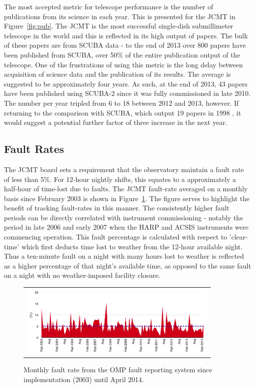 \documentclass[]{spie}  %
\begin{document}
The most accepted metric for telescope performance is the number of
publications from its science in each year. This is presented for the
JCMT in Figure~\ref{fig:pub}. The JCMT is the most successful
single-dish submillimeter telescope in the world and this is reflected
in its high output of papers. The bulk of these papers are from SCUBA
data - to the end of 2013 over 800 papers have been published from
SCUBA, over 50$\%$ of the entire publication output of the
telescope. One of the frustrations of using this metric is the long
delay between acquisition of science data and the publication of its
results. The average is suggested to be approximately four years. As
such, at the end of 2013, 43 papers have been published using SCUBA-2
since it was fully commissioned in late 2010. The number per year
tripled from 6 to 18 between 2012 and 2013, however. If returning to
the comparison with SCUBA, which output 19 papers in 1998 , it would
suggest a potential further factor of three increase in the next year.


\subsection{Fault Rates}\label{sec:rates}

The JCMT board sets a requirement that the observatory maintain a
fault rate of less than 5$\%$. For 12-hour nightly shifts, this
equates to a approximately a half-hour of time-lost due to faults. The
JCMT fault-rate averaged on a monthly basis since February 2003 is
shown in Figure~\ref{fig:fault}. The figure serves to highlight the
benefit of tracking fault-rates in this manner. The consistently
higher fault periods can be directly correlated with instrument
commissioning - notably the period in late 2006 and early 2007 when
the HARP and ACSIS instruments were commencing operation. This fault
percentage is calculated with respect to 'clear-time' which first
deducts time lost to weather from the 12-hour available night. Thus a
ten-minute fault on a night with many hours lost to weather is
reflected as a higher percentage of that night's available time, as
opposed to the same fault on a night with no weather-imposed facility
closure.

 \begin{figure}
   \begin{center}
   \begin{tabular}{c}
   \includegraphics[height=3.5cm]{Faultrate2003_2014.png}
   \end{tabular}
   \end{center}
   \caption{\label{fig:fault}Monthly fault rate from the OMP fault reporting system since implementation (2003) until April 2014.}
\end{figure}
\end{document}
